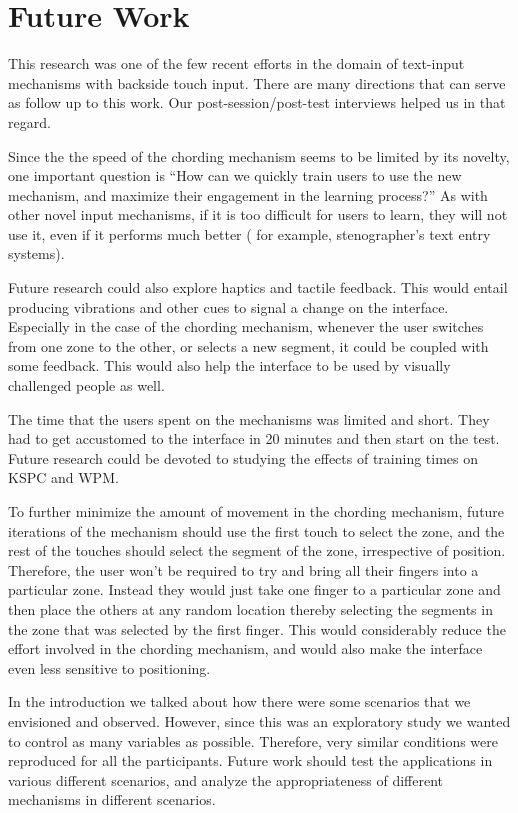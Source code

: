 \section{Future Work}

This research was one of the few recent efforts in the domain of
text-input mechanisms with backside touch input. There are many
directions that can serve as follow up to this work. Our
post-session/post-test interviews helped us in that regard.

Since the the speed of the chording mechanism seems to be limited by
its novelty, one important question is ``How can we quickly train
users to use the new mechanism, and maximize their engagement in the
learning process?''  As with other novel input mechanisms, if it is
too difficult for users to learn, they will not use it, even if it
performs much better ( for example, stenographer's text entry
systems).

Future research could also explore haptics and tactile feedback. This
would entail producing vibrations and other cues to signal a change on
the interface. Especially in the case of the chording mechanism,
whenever the user switches from one zone to the other, or selects a
new segment, it could be coupled with some feedback. This would also
help the interface to be used by visually challenged people as well.

The time that the users spent on the mechanisms was limited and short. They had to get accustomed to the interface in 20 minutes and then start on the test. Future research could be devoted to studying the effects of training times on KSPC and WPM. 

To further minimize the amount of movement in the chording mechanism,
future iterations of the mechanism should use the first touch to
select the zone, and the rest of the touches should select the segment
of the zone, irrespective of position. Therefore, the user won't be
required to try and bring all their fingers into a particular
zone. Instead they would just take one finger to a particular zone and
then place the others at any random location thereby selecting the
segments in the zone that was selected by the first finger. This would
considerably reduce the effort involved in the chording mechanism, and
would also make the interface even less sensitive to positioning.

In the introduction we talked about how there were some scenarios that
we envisioned and observed. However, since this was an exploratory
study we wanted to control as many variables as possible. Therefore,
very similar conditions were reproduced for all the
participants. Future work should test the applications in various
different scenarios, and analyze the appropriateness of different
mechanisms in different scenarios.
